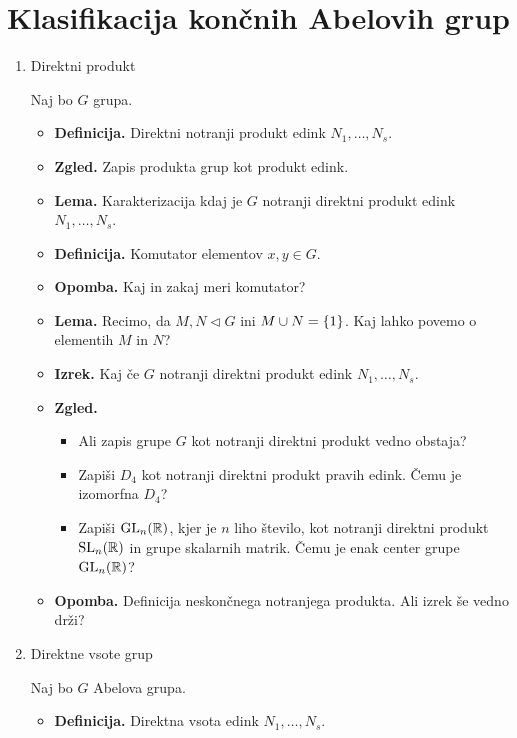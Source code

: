 \section{Klasifikacija končnih Abelovih grup}
\begin{enumerate}
    \item Direktni produkt

    Naj bo \(G\) grupa.
    \begin{itemize}
        \item \textbf{Definicija.} Direktni notranji produkt edink \(N_1, \ldots, N_s\).
        \item \textbf{Zgled.} Zapis produkta grup kot produkt edink.
        \item \textbf{Lema.} Karakterizacija kdaj je \(G\) notranji direktni produkt edink \(N_1, \ldots, N_s\).
        \item \textbf{Definicija.} Komutator elementov \(x, y \in G\).
        \item \textbf{Opomba.} Kaj in zakaj meri komutator?
        \item \textbf{Lema.} Recimo, da \(M, N \triangleleft G\) ini \(M \cup N = \{1\}\). Kaj lahko povemo o elementih \(M\) in \(N\)?
        \item \textbf{Izrek.} Kaj če \(G\) notranji direktni produkt edink \(N_1, \ldots, N_s\). \todo{*}
        \item \textbf{Zgled.} \
        \begin{itemize}
            \item Ali zapis grupe \(G\) kot notranji direktni produkt vedno obstaja?
            \item Zapiši \(D_4\) kot notranji direktni produkt pravih edink. Čemu je izomorfna \(D_4\)?
            \item Zapiši \(\operatorname{GL}_n(\mathbb{R})\), kjer je \(n\) liho število, kot notranji direktni produkt \(\operatorname{SL}_n(\mathbb{R})\) in grupe skalarnih matrik. Čemu je enak center grupe \(\operatorname{GL}_n(\mathbb{R})\)?
        \end{itemize}
        \item \textbf{Opomba.} Definicija neskončnega notranjega produkta. Ali izrek še vedno drži?
    \end{itemize}

    \item Direktne vsote grup
    
    Naj bo \(G\) Abelova grupa.
    \begin{itemize}
        \item \textbf{Definicija.} Direktna vsota edink \(N_1, \ldots, N_s\).
    \end{itemize}


\end{enumerate}
